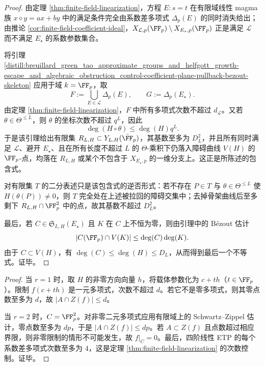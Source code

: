 \begin{proof}
由定理 \ref{thm:finite-field-linearization}，方程 \(E:s=t\) 在有限域线性 magma 族 \(x\diamond y=ax+by\) 中的满足条件完全由系数差多项式 \(\Delta_p(E)\) 的同时消失给出；由推论 \ref{cor:finite-field-coefficient-ideal}，\(X_{\mathcal L,p}(\FF_p)\setminus X_{E_\star,p}(\FF_p)\) 正是满足 \(\mathcal L\) 而不满足 \(E_\star\) 的系数参数集合。

将引理 \ref{distill:breuillard_green_tao_approximate_groups_and_helfgott_growth-escape_and_algebraic_obstruction_control-coefficient-plane-pullback-bezout-skeleton} 应用于域 \(k=\FF_p\)，取
\[
F:=\bigcup_{E\in\mathcal L}\Delta_p(E),
\qquad
G:=\Delta_p(E_\star).
\]
由定理 \ref{thm:finite-field-linearization}，\(F\) 中所有多项式次数不超过 \(d_{\mathcal L}\)。又若 \(\theta\in\Theta^{\le L}\)，则 \(\theta\) 的坐标次数不超过 \(q^L\)，因此
\[
\deg(H\circ\theta)\le \deg(H)q^L.
\]
于是该引理给出有限集 \(R_{L,H}\subset Y_{L,H}(\bar{\FF}_p)\)，其基数至多为 \(D_L^2\)，并且所有同时满足 \(\mathcal L\)、避开 \(E_\star\)、且在所有长度不超过 \(L\) 的 \(\Theta\)-乘积下仍落入障碍曲线 \(V(H)\) 的 \(\FF_p\)-点，均落在 \(R_{L,H}\) 或某个不包含于 \(X_{E_\star,p}\) 的一维分支上。这正是所陈述的包含式。

对有限集 \(T\) 的二分表述只是该包含式的逆否形式：若不存在 \(P\in T\) 与 \(\theta\in\Theta^{\le L}\) 使 \(H(\theta(P))\ne0\)，则 \(T\) 完全处在上述被拉回的障碍交集中；去掉骨架曲线后至多剩下 \(R_{L,H}\cap\FF_p^2\) 中的点，故其基数不超过 \(D_L^2\)。

最后，若 \(C\in\mathfrak S_{L,H}(E_\star)\) 且 \(K\) 在 \(C\) 上不恒为零，则由引理中的 Bézout 估计
\[
|C(\FF_p)\cap V(K)|\le \deg(C)\deg(K).
\]
由于 \(C\subset V(H)\)，有 \(\deg(C)\le\deg(H)\le D_L\)，从而得到最后一个不等式。证毕。
\end{proof}

\begin{proof}
当 \(r=1\) 时，取 \(H\) 的非零方向向量 \(h\)，将载体参数化为 \(c+th\)（\(t\in\FF_p\)）。限制 \(f(c+th)\) 是一元多项式，次数不超过 \(d\)。若它不是零多项式，则其零点数至多为 \(d\)，故 \(|A\cap Z(f)|\leq d\)。

当 \(r=2\) 时，\(C=\FF_p^2\)。对非零二元多项式应用有限域上的 Schwartz--Zippel 估计，零点数至多为 \(dp\)，于是 \(|A\cap Z(f)|\leq dp\)。若 \(A\subset Z(f)\) 且点数超过相应界限，则非零限制的情形不可能发生，故 \(f|_C=0\)。最后，四阶线性 ETP 的每个系数差多项式次数至多为 \(4\)，这是定理 \ref{thm:finite-field-linearization} 的次数控制。证毕。
\end{proof}

